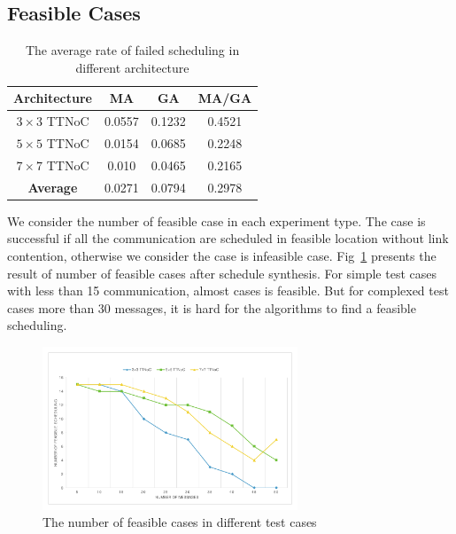 \documentclass[journal]{IEEEtran}
\theoremstyle{remark}
\begin{document}
\subsection{Feasible Cases}
\begin{table}[!t]
	\renewcommand{\arraystretch}{1.3}
	\caption{The average rate of failed scheduling in different architecture }
	\label{t:performance}
	\centering
	\begin{tabular}{|c||c||c||c|}
		\hline
		\textbf{Architecture} & \textbf{MA} &\textbf{GA} & \textbf{MA/GA}\\
		\hline 
		$3\times 3$ TTNoC&0.0557& 0.1232&	0.4521		
		\\
		\hline
		$5\times 5$ TTNoC& 0.0154	& 0.0685&0.2248\\
		\hline
		$7\times 7$ TTNoC& 0.010& 	0.0465&	0.2165\\
		\hline		
		\hline
		\textbf{Average }& 	0.0271 &0.0794&0.2978\\
		\hline
	\end{tabular}	
\end{table}
We consider the number of feasible case in each experiment type.
The case is successful if all the communication are scheduled in feasible location without link contention,
 otherwise we consider the case is infeasible case.
Fig~\ref{f:feasible} presents the result of number of feasible cases after schedule synthesis.
For simple test cases with less than 15 communication,
 almost cases is feasible.
But for complexed test cases more than 30 messages, it is hard for the algorithms to find a feasible scheduling.
\begin{figure}[!t]
	\centering
	\includegraphics[width=3in]{picture/feasible_case}
	\caption{The number of feasible cases in different test cases}
	\label{f:feasible}
\end{figure}
\end{document}
